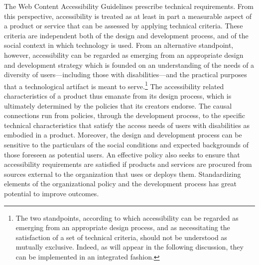 \documentclass{sig-alternate} %
\begin{document}
\begin{large}
The Web Content Accessibility Guidelines prescribe technical requirements. From this perspective, accessibility is treated as at least in part a measurable aspect of a product or service that can be assessed by applying technical criteria. These criteria are independent both of the design and development process, and of the social context in which technology is used. From an alternative standpoint, however, accessibility can be regarded as emerging from an appropriate design and development strategy which is founded on an understanding of the needs of a diversity of users—including those with disabilities—and the practical purposes that a technological artifact is meant to serve.\footnote{The two standpoints, according to which accessibility can be regarded as emerging from an appropriate design process, and as necessitating the satisfaction of a set of technical criteria, should not be understood as mutually exclusive. Indeed, as will appear in the following discussion, they can be implemented in an integrated fashion.} The accessibility related characteristics of a product thus emanate from its design process, which is ultimately determined by the policies that its creators endorse. The causal connections run from policies, through the development process, to the specific technical characteristics that satisfy the access needs of users with disabilities as embodied in a product. Moreover, the design and development process can be sensitive to the particulars of the social conditions and expected backgrounds of those foreseen as potential users. An effective policy also seeks to ensure that accessibility requirements are satisfied if products and services are procured from sources external to the organization that uses or deploys them. Standardizing elements of the organizational policy and the development process has great potential to improve outcomes.


\end{large}
\end{document}
